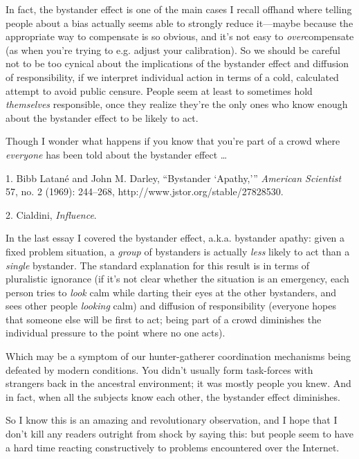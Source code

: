 {
 In fact, the bystander effect is one of the main cases I recall
offhand where telling people about a bias actually seems able to
strongly reduce it---maybe because the appropriate way to compensate is
so obvious, and it's not easy to
\textit{over}compensate (as when you're trying to e.g.
adjust your calibration). So we should be careful not to be too cynical
about the implications of the bystander effect and diffusion of
responsibility, if we interpret individual action in terms of a cold,
calculated attempt to avoid public censure. People seem at least to
sometimes hold \textit{themselves} responsible, once they realize
they're the only ones who know enough about the
bystander effect to be likely to act.}

{
 Though I wonder what happens if you know that
you're part of a crowd where \textit{everyone} has been
told about the bystander effect \ldots}

\myendsectiontext


\bigskip

{
 1. Bibb Latané and John M. Darley, ``Bystander
`Apathy,'''
\textit{American Scientist} 57, no. 2 (1969): 244--268,
http://www.jstor.org/stable/27828530.}

{
 2. Cialdini, \textit{Influence}.}


{
 In the last essay I covered the bystander effect, a.k.a. bystander
apathy: given a fixed problem situation, a \textit{group} of bystanders
is actually \textit{less} likely to act than a \textit{single}
bystander. The standard explanation for this result is in terms of
pluralistic ignorance (if it's not clear whether the
situation is an emergency, each person tries to \textit{look} calm
while darting their eyes at the other bystanders, and sees other people
\textit{looking} calm) and diffusion of responsibility (everyone hopes
that someone else will be first to act; being part of a crowd
diminishes the individual pressure to the point where no one acts). }

{
 Which may be a symptom of our hunter-gatherer coordination
mechanisms being defeated by modern conditions. You
didn't usually form task-forces with strangers back in
the ancestral environment; it was mostly people you knew. And in fact,
when all the subjects know each other, the bystander effect
diminishes.}

{
 So I know this is an amazing and revolutionary observation, and I
hope that I don't kill any readers outright from shock
by saying this: but people seem to have a hard time reacting
constructively to problems encountered over the Internet.}

